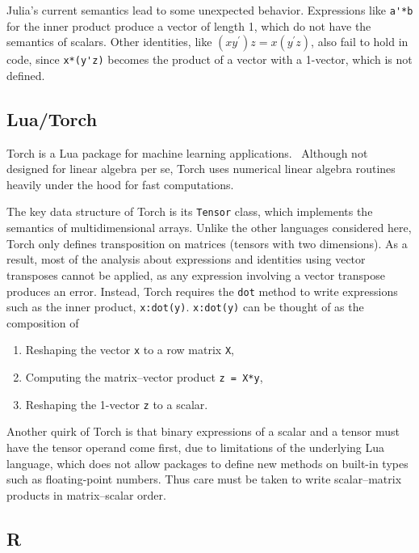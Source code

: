 Julia's current semantics lead to some unexpected behavior. Expressions like
\verb|a'*b| for the inner product produce a vector of length 1, which do not
have the semantics of scalars. Other identities, like $(xy^\prime)z =
x(y^\prime z)$, also fail to hold in code, since \verb|x*(y'z)| becomes the
product of a vector with a 1-vector, which is not defined.


\subsection{Lua/Torch}

Torch is a Lua\cite{Lua} package for machine learning applications.~\cite{Torch}
Although not designed for linear algebra per se, Torch uses numerical linear
algebra routines heavily under the hood for fast computations.

The key data structure of Torch is its \verb|Tensor| class, which implements
the semantics of multidimensional arrays. Unlike the other languages considered
here, Torch only defines transposition on matrices (tensors with two
dimensions). As a result, most of the analysis about expressions and identities
using vector transposes cannot be applied, as any expression involving a vector
transpose produces an error.
Instead, Torch requires the \verb|dot| method to write expressions such as the inner product,
\verb|x:dot(y)|. \verb|x:dot(y)| can be thought of as the composition of
\begin{enumerate}

\item
Reshaping the vector \verb|x| to a row matrix \verb|X|,

\item
Computing the matrix--vector product \verb|z = X*y|,

\item
Reshaping the 1-vector \verb|z| to a scalar.

\end{enumerate}

Another quirk of Torch is that binary expressions of a scalar and a tensor must
have the tensor operand come first, due to limitations of the underlying Lua
language, which does not allow packages to define new methods on built-in
types such as floating-point numbers. Thus care must be taken to write
scalar--matrix products in matrix--scalar order.


\subsection{R}


